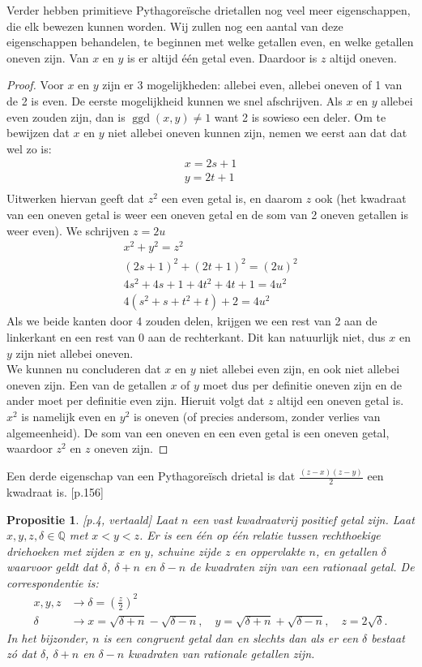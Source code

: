 \documentclass[12pt,reqno]{article}
\newcommand*{\QQ}{\ensuremath{\mathbb{Q}}}
\theoremstyle{theorem}
\newtheorem{proposition}[theorem]{Propositie}
\theoremstyle{definition}
\DeclareMathOperator{\ggd}{ggd}
\begin{document}
	Verder hebben primitieve Pythagore\"ische drietallen nog veel meer eigenschappen, die elk bewezen kunnen worden. Wij zullen nog een aantal van deze eigenschappen behandelen, te beginnen met welke getallen even, en welke getallen oneven zijn. Van $x$ en $y$ is er altijd \'e\'en getal even. Daardoor is $z$ altijd oneven.
	\begin{proof}
	Voor $x$ en $y$ zijn er 3 mogelijkheden: allebei even, allebei oneven of 1 van de 2 is even. De eerste mogelijkheid kunnen we snel afschrijven. Als $x$ en $y$ allebei even zouden zijn, dan is $\ggd(x,y) \neq 1$ want 2 is sowieso een deler. Om te bewijzen dat $x$ en $y$ niet allebei oneven kunnen zijn, nemen we eerst aan dat dat wel zo is:
	\begin{align*}
	x = 2s + 1\\
	y = 2t + 1\\
	\end{align*}
	Uitwerken hiervan geeft dat $z^2$ een even getal is, en daarom $z$ ook (het kwadraat van een oneven getal is weer een oneven getal en de som van 2 oneven getallen is weer even). We schrijven $z = 2u$
	\begin{align*}
	x^2 + y^2 = z^2\\
	(2s + 1)^2 + (2t + 1)^2 = (2u)^2\\
	4s^2 + 4s + 1 +4t^2 + 4t + 1 = 4u^2\\
	4(s^2 + s + t^2 + t) + 2 = 4u^2
	\end{align*}
	Als we beide kanten door 4 zouden delen, krijgen we een rest van 2 aan de linkerkant en een rest van 0 aan de rechterkant. Dit kan natuurlijk niet, dus $x$ en $y$ zijn niet allebei oneven. \\
	We kunnen nu concluderen dat $x$ en $y$ niet allebei even zijn, en ook niet allebei oneven zijn. Een van de getallen $x$ of $y$ moet dus per definitie oneven zijn en de ander moet per definitie even zijn. Hieruit volgt dat $z$ altijd een oneven getal is. $x^2$ is namelijk even en $y^2$ is oneven (of precies andersom, zonder verlies van algemeenheid). De som van een oneven en een even getal is een oneven getal, waardoor $z^2$ en $z$ oneven zijn.
	\end{proof}
	Een derde eigenschap van een Pythagore\"isch drietal is dat $\frac{(z-x)(z-y)}{2}$ een kwadraat is. \cite{Posamentier}[p.156]
	\begin{proposition}
		\cite{Koblitz}[p.4, vertaald] Laat $n$ een vast kwadraatvrij positief getal zijn. Laat $x,y,z,\delta \in\QQ$ met $x<y<z$. Er is een \'e\'en op \'e\'en relatie tussen rechthoekige driehoeken met zijden $x$ en $y$, schuine zijde $z$ en oppervlakte $n$, en getallen $\delta$ waarvoor geldt dat $\delta$, $\delta +n$ en $\delta -n$ de kwadraten zijn van een rationaal getal. De correspondentie is:
		\begin{align}
			x,y,z &\rightarrow \delta = \left( \frac{z}{2} \right)^2 \\
			\delta &\rightarrow x=\sqrt{\delta+n} - \sqrt{\delta-n},\quad y = \sqrt{\delta+n}+\sqrt{\delta-n},\quad z = 2\sqrt{\delta}.
		\end{align}
		In het bijzonder, $n$ is een congruent getal dan en slechts dan als er een $\delta$ bestaat z\'o dat $\delta$, $\delta+n$ en $\delta-n$ kwadraten van rationale getallen zijn.
	\end{proposition}
\end{document}
